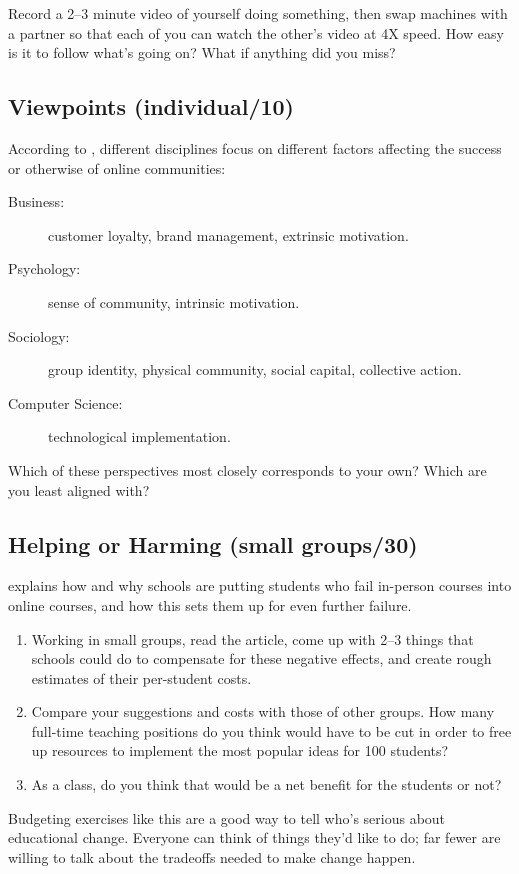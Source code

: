 Record a 2--3 minute video of yourself doing something, then swap
machines with a partner so that each of you can watch the other's video
at 4X speed. How easy is it to follow what's going on? What if anything
did you miss?

\subsection*{Viewpoints (individual/10)}

According to \cite{Irib2009}, different disciplines focus on
different factors affecting the success or otherwise of online
communities:

\begin{description}
\item[Business:]
customer loyalty, brand management, extrinsic motivation.
\item[Psychology:]
sense of community, intrinsic motivation.
\item[Sociology:]
group identity, physical community, social capital, collective
action.
\item[Computer Science:]
technological implementation.
\end{description}

Which of these perspectives most closely corresponds to your own? Which
are you least aligned with?

\subsection*{Helping or Harming (small groups/30)}

explains how and why schools are putting students who fail in-person courses
into online courses, and how this sets them up for even further failure.

\begin{enumerate}
\item
  Working in small groups, read the article, come up with 2--3 things
  that schools could do to compensate for these negative effects, and
  create rough estimates of their per-student costs.
\item
  Compare your suggestions and costs with those of other groups. How
  many full-time teaching positions do you think would have to be cut
  in order to free up resources to implement the most popular ideas
  for 100 students?
\item
  As a class, do you think that would be a net benefit for the
  students or not?
\end{enumerate}

Budgeting exercises like this are a good way to tell who's serious about
educational change. Everyone can think of things they'd like to do; far
fewer are willing to talk about the tradeoffs needed to make change
happen.
